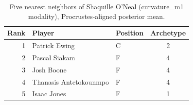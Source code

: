 \begin{table}[htbp]
  \centering\small
  \begin{tabular}{rllc}
    \toprule
    Rank & Player & Position & Archetype \\
    \midrule
    1 & Patrick Ewing & C & 2 \\
    2 & Pascal Siakam & F & 4 \\
    3 & Josh Boone & F & 4 \\
    4 & Thanasis Antetokounmpo & F & 4 \\
    5 & Isaac Jones & F & 1 \\
    \bottomrule
  \end{tabular}
  \caption{Five nearest neighbors of Shaquille O'Neal (curvature_m1 modality), Procrustes-aligned posterior mean.}
  \label{tab:Shaquille_O_Neal_neighbors_curvature_m1}
\end{table}

